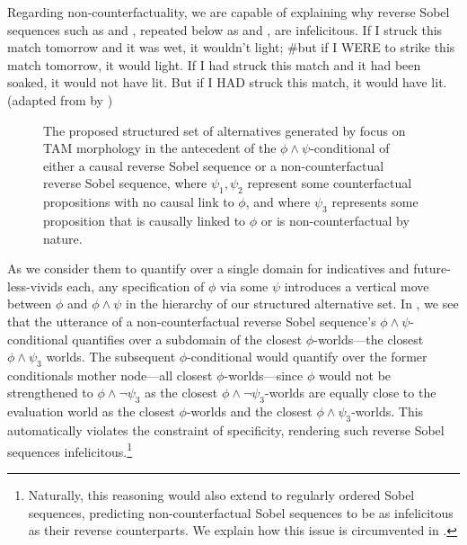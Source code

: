 Regarding non-counterfactuality, we are capable of explaining why reverse Sobel sequences such as  and , repeated below as  and , are infelicitous.
\ex{}
    If I struck this match tomorrow and it was wet, it wouldn't light; \#but if I \MakeUppercase{were} to strike this match tomorrow, it would light.
\xe
\ex{}If I had struck this match and it had been soaked, it would not have lit. But if I \MakeUppercase{had} struck this match, it would have lit.\\%
\emptyfill(adapted from \textcite[p. 106]{Stalnaker1968} by \textcite[p. 487]{Lewis2018})
\xe
\begin{figure}[!htb]
    \centering
    \resizebox{\textwidth}{!}{}
    \caption{The proposed structured set of alternatives generated by focus on TAM morphology in the antecedent of the $\phi\land\psi$-conditional of either a causal reverse Sobel sequence or a non-counterfactual reverse Sobel sequence, where $\psi_1,\psi_2$ represent some counterfactual propositions with no causal link to $\phi$, and where $\psi_3$ represents some proposition that is causally linked to $\phi$ or is non-counterfactual by nature.}
\end{figure}
As we consider them to quantify over a single domain for indicatives and future-less-vivids each, any specification of $\phi$ via some $\psi$ introduces a vertical move between $\phi$ and $\phi\land\psi$ in the hierarchy of our structured alternative set. In , we see that the utterance of a non-counterfactual reverse Sobel sequence's $\phi\land\psi$-conditional quantifies over a subdomain of the closest $\phi$-worlds---the closest $\phi\land\psi_3$ worlds. The subsequent $\phi$-conditional would quantify over the former conditionals mother node---all closest $\phi$-worlds---since $\phi$ would not be strengthened to $\phi\land\neg\psi_3$ as the closest $\phi\land\neg\psi_3$-worlds are equally close to the evaluation world as the closest $\phi$-worlds and the closest $\phi\land\psi_3$-worlds. This automatically violates the constraint of specificity, rendering such reverse Sobel sequences infelicitous.\footnote{Naturally, this reasoning would also extend to regularly ordered Sobel sequences, predicting non-counterfactual Sobel sequences to be as infelicitous as their reverse counterparts. We explain how this issue is circumvented in .} 

